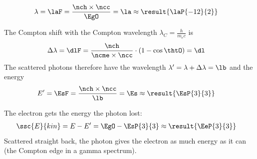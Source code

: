 \begin{abcliste}
\abc
\begin{align}
 \lambda &= \laF = \frac{\nch\times\ncc}{\EgO} = \la \approx \result{\laP{-12}{2}}
\end{align}

\abc The Compton shift with the Compton wavelength $\lambda_C = \frac{h}{m_e c}$ is
\begin{align}
 \Delta\lambda &= \dlF = \frac{\nch}{\ncme\times\ncc}\cdot\left(1-\cos\thtO\right) = \dl
\end{align}
The scattered photons therefore have the wavelength $\lambda' = \lambda+\Delta\lambda = \lb$ and the energy
\begin{align}
 E' &= \EsF = \frac{\nch\times\ncc}{\lb} = \Es \approx \result{\EsP{3}{3}}
\end{align}

\abc The electron gets the energy the photon lost:
\begin{align}
 \ssc{E}{kin} &= E-E' = \EgO - \EsP{3}{3} \approx \result{\EeP{3}{3}}
\end{align}
Scattered straight back, the photon gives the electron as much energy as it can (the Compton edge in a gamma spectrum).
\end{abcliste}
